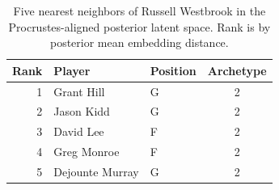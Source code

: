 \begin{table}[htbp]
  \centering\small
  \begin{tabular}{rllc}
    \toprule
    Rank & Player & Position & Archetype \\
    \midrule
    1 & Grant Hill & G & 2 \\
    2 & Jason Kidd & G & 2 \\
    3 & David Lee & F & 2 \\
    4 & Greg Monroe & F & 2 \\
    5 & Dejounte Murray & G & 2 \\
    \bottomrule
  \end{tabular}
  \caption{Five nearest neighbors of Russell Westbrook in the Procrustes-aligned posterior latent space. Rank is by posterior mean embedding distance.}
  \label{tab:Russell_Westbrook_neighbors}
\end{table}

